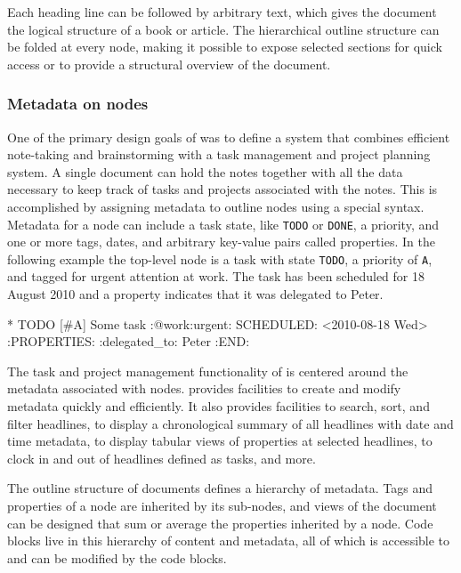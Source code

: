 \documentclass[article,shortnames]{jss}
\begin{document}
Each heading line can be followed by arbitrary text,
which gives the document the logical structure of a book or article.  The
hierarchical outline structure can be folded at every node, making it
possible to expose selected sections for quick access or to provide a
structural overview of the document.
\subsubsection{Metadata on nodes}
\label{sec-3-1-2}


One of the primary design goals of  was to define a system
that combines efficient note-taking and brainstorming with a task
management and project planning system.  A single  document
can hold the notes together with all the data necessary to keep track
of tasks and projects associated with the notes.  This is accomplished
by assigning metadata to outline nodes using a special syntax.
Metadata for a node can include a task state, like \texttt{TODO} or \texttt{DONE}, a
priority, and one or more tags, dates, and arbitrary key-value pairs
called properties.  In the following example the top-level node is a
task with state \texttt{TODO}, a priority of \texttt{A}, and tagged for urgent
attention at work.  The task has been scheduled for 18 August 2010 and
a property indicates that it was delegated to Peter.


\begin{Code}
* TODO [#A] Some task         :@work:urgent:
   SCHEDULED: <2010-08-18 Wed>
  :PROPERTIES:
    :delegated_to: Peter
  :END:
\end{Code}




The task and project management functionality of  is centered
around the metadata associated with nodes.   provides
facilities to create and modify metadata quickly and efficiently.  It
also provides facilities to search, sort, and filter headlines, to
display a chronological summary of all headlines with date and time
metadata, to display tabular views of properties at selected
headlines, to clock in and out of headlines defined as tasks, and
more.

The outline structure of documents defines a hierarchy of
metadata.  Tags and properties of a node are inherited by its
sub-nodes, and views of the document can be designed that sum or
average the properties inherited by a node.  Code blocks live in this
hierarchy of content and metadata, all of which is accessible to and
can be modified by the code blocks.
\end{document}
